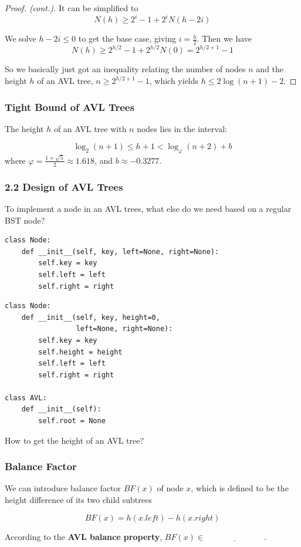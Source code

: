 \documentclass[aspectratio=169, 14pt]{beamer}
\begin{document}
\begin{frame}
\begin{proof}[Proof. (cont.)]
It can be simplified to
\[N(h) \geq 2^{i} - 1 + 2^iN(h-2i)\]

We solve $h-2i \leq 0$ to get the base case, giving $i = \frac{h}{2}$. Then we have
\[N(h) \geq 2^{h/2} - 1 + 2^{h/2}N(0) = 2^{h/2 + 1} - 1\] 

So we basically just got an inequality relating the number of nodes $n$ and the height $h$ of an AVL tree, $n\geq 2^{h/2 + 1} - 1$, which yields $h \leq 2\log{(n + 1)} - 2$.
\end{proof}
    

\end{frame}

\begin{frame}
    \frametitle{Tight Bound of AVL Trees}
    The height $h$ of an AVL tree with $n$ nodes lies in the interval:

    \[ \log_{2}(n + 1) \leq h + 1 < \log_{\varphi}(n + 2) + b \]
where $\varphi = \frac{1 + \sqrt{5}}{2} \approx 1.618$, and $b \approx -0.3277$.
\end{frame}

\begin{frame}[fragile]
    \frametitle{2.2 Design of AVL Trees}
    
 To implement a node in an AVL trees, what else do we need based on a regular BST node?
    \begin{verbatim}
class Node:
    def __init__(self, key, left=None, right=None):
        self.key = key
        self.left = left
        self.right = right
    \end{verbatim}
\end{frame}

\begin{frame}[fragile]

\begin{verbatim}
class Node:
    def __init__(self, key, height=0, 
                 left=None, right=None):
        self.key = key
        self.height = height
        self.left = left
        self.right = right

class AVL:
    def __init__(self):
        self.root = None
\end{verbatim}
 How to get the height of an AVL tree?
\end{frame}

\begin{frame}
    \frametitle{Balance Factor}
We can introduce \alert{balance factor} $BF(x)$ of node $x$, which is defined to be the height difference of its two child subtrees 

\[BF(x) = h(x.left) - h(x.right)\]

According to the \textbf{AVL balance property}, $BF(x) \in \underline{\hspace{3cm}}$.

\end{frame}
\end{document}
